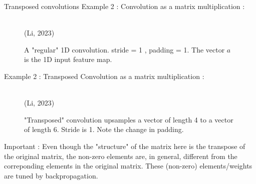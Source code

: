 \begin{vbframe}{Transposed convolutions}
\framebreak
Example 2 : Convolution as a matrix multiplication : 
\begin{figure}
\centering
{}
\tiny{\\(Li, 2023)}
\caption{A "regular" 1D convolution. stride = 1 , padding = 1. The vector $a$ is the 1D input feature map. }
\end{figure}
   
  
\framebreak
Example 2 : Transposed Convolution as a matrix multiplication :
\begin{figure}
\centering
{}
\tiny{\\(Li, 2023)}
\caption{"Transposed" convolution upsamples a vector of length 4 to a vector of length 6. Stride is 1. Note the change in padding.}
\end{figure}
\small{Important : Even though the "structure" of the matrix here is the transpose of the original matrix, the non-zero elements are, in general, different from the correponding elements in the original matrix. These (non-zero) elements/weights are tuned by backpropagation.} 


\end{vbframe}
